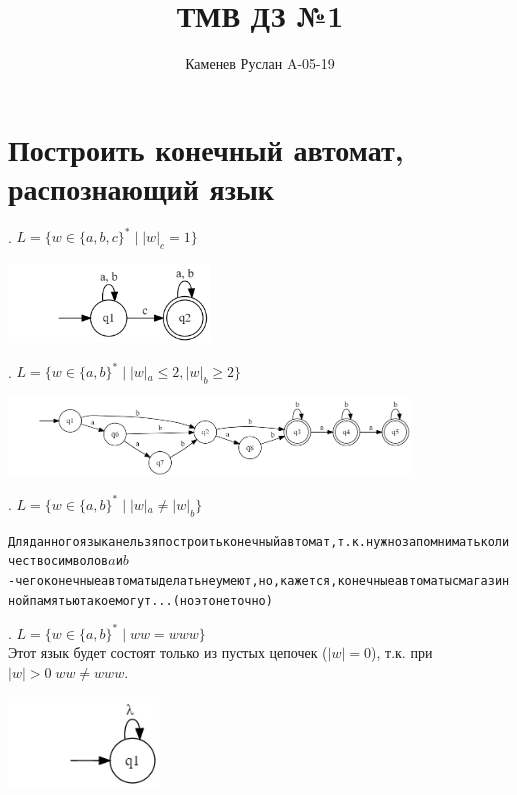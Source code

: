 \documentclass{article}
\title{ТМВ ДЗ №1}
\author{Каменев Руслан A-05-19}
\begin{document}
\maketitle
\section{Построить конечный автомат, распознающий язык}


    . $L = \{w \in \{a, b, c\}^*  \; | \; |w|_c = 1\}$
    \begin{center}
        \includegraphics[width=0.4\textwidth]{task1/pic1.1}
    \end{center}
    . $L = \{w \in \{a, b\}^* \; | \; |w|_a \leq 2, |w|_b \geq 2\}$
    \begin{center}
        \includegraphics[width=0.8\textwidth]{task1/pic1.2}\\
    \end{center}
    . $L = \{w \in \{a, b\}^* \; | \; |w|_a \neq |w|_b\}$
    \begin{center}
        \begin{alltt} 
        Для данного языка нельзя построить конечный автомат, т.к. нужно запомнимать количество символов ${a}$ и ${b}$ - чего конечные автоматы делать не умеют, но, кажется, конечные автоматы с магазинной памятью такое могут ... (но это неточно)
        \end{alltt}
    \end{center}
    . $L = \{w \in \{a, b\}^* \; | \; ww = www\}$\\
    Этот язык будет состоят только из пустых цепочек ($|w| = 0$), т.к. \newline
    при $|w|>0\;ww \neq www$.
    \begin{center}
        \includegraphics[width=0.3\textwidth]{task1/pic1.4}\\
    \end{center}
    
\end{document}

